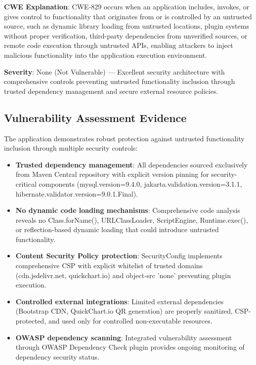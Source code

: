 \documentclass[]{UCD_CS_FYP_Report}
\begin{document}
\textbf{CWE Explanation}: CWE-829 occurs when an application includes, invokes, or gives control to functionality that originates from or is controlled by an untrusted source, such as dynamic library loading from untrusted locations, plugin systems without proper verification, third-party dependencies from unverified sources, or remote code execution through untrusted APIs, enabling attackers to inject malicious functionality into the application execution environment.

\textbf{Severity}: None (Not Vulnerable) — Excellent security architecture with comprehensive controls preventing untrusted functionality inclusion through trusted dependency management and secure external resource policies.

\subsection{Vulnerability Assessment Evidence}
The application demonstrates robust protection against untrusted functionality inclusion through multiple security controls:
\begin{itemize}
	\item \textbf{Trusted dependency management}: All dependencies sourced exclusively from Maven Central repository with explicit version pinning for security-critical components (mysql.version=9.4.0, jakarta.validation.version=3.1.1, hibernate.validator.version=9.0.1.Final).
	\item \textbf{No dynamic code loading mechanisms}: Comprehensive code analysis reveals no Class.forName(), URLClassLoader, ScriptEngine, Runtime.exec(), or reflection-based dynamic loading that could introduce untrusted functionality.
	\item \textbf{Content Security Policy protection}: SecurityConfig implements comprehensive CSP with explicit whitelist of trusted domains (cdn.jsdelivr.net, quickchart.io) and object-src 'none' preventing plugin execution.
	\item \textbf{Controlled external integrations}: Limited external dependencies (Bootstrap CDN, QuickChart.io QR generation) are properly sanitized, CSP-protected, and used only for controlled non-executable resources.
	\item \textbf{OWASP dependency scanning}: Integrated vulnerability assessment through OWASP Dependency Check plugin provides ongoing monitoring of dependency security status.
\end{itemize}
\end{document}
